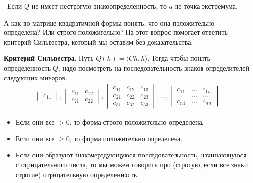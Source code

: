 \notice \, Если $Q$ не имеет нестрогую знакоопределенность, то $a$ не точка экстремума.

\vspace*{5mm}

А как по матрице квадратичной формы понять, что она положительно определена? Или строго положительно?
На этот вопрос помогает ответить критерий Сильвестра, который мы оставим без доказательства.

\textbf{Критерий Сильвестра.} Путь $Q(h) = \langle Ch, h \rangle$. 
Тогда чтобы понять определенность $Q$, надо посмотреть на последовательность знаков определителей следующих миноров: \begin{gather*}
    \begin{vmatrix}
        c_{11}
    \end{vmatrix}, \begin{vmatrix}
        c_{11} & c_{12} \\
        c_{21} & c_{22}
    \end{vmatrix}, \begin{vmatrix}
        c_{11} & c_{12} & c_{13} \\
        c_{21} & c_{22} & c_{23} \\
        c_{31} & c_{32} & c_{33}    
    \end{vmatrix}, \dots, \begin{vmatrix}
        c_{11} & \dots & c_{1n} \\
        \dots & \dots & \dots \\
        c_{n1} & \dots & c_{nn} 
    \end{vmatrix}
\end{gather*} 
\begin{itemize}
    \item Если они все $> 0$, то форма строго положительно определена.
    \item Если они все $\geqslant 0$, то форма положительно определена.
    \item Если они образуют знакочередующуюся последовательность, начинающуюся с отрицательного числа, то мы можем говорить про (строгую, если все знаки строгие) отрицательную определенность.
\end{itemize}

